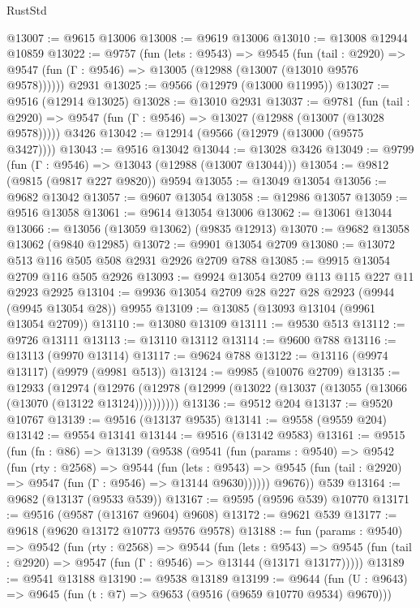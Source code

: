 \begin{lexlean}{RustStd}
\begin{coremodule}
@13007 := @9615 @13006
@13008 := @9619 @13006
@13010 := @13008 @12944 @10859
@13022 := @9757
    (fun (lets : @9543) =>
    @9545
      (fun (tail : @2920) =>
      @9547 (fun (Γ : @9546) => @13005 (@12988 (@13007 (@13010 @9576 @9578))))))
    @2931
@13025 := @9566 (@12979 (@13000 @11995))
@13027 := @9516 (@12914 @13025)
@13028 := @13010 @2931
@13037 := @9781
    (fun (tail : @2920) => @9547 (fun (Γ : @9546) => @13027 (@12988 (@13007 (@13028 @9578)))))
    @3426
@13042 := @12914 (@9566 (@12979 (@13000 (@9575 @3427))))
@13043 := @9516 @13042
@13044 := @13028 @3426
@13049 := @9799 (fun (Γ : @9546) => @13043 (@12988 (@13007 @13044)))
@13054 := @9812 (@9815 (@9817 @227 @9820)) @9594
@13055 := @13049 @13054
@13056 := @9682 @13042
@13057 := @9607 @13054
@13058 := @12986 @13057
@13059 := @9516 @13058
@13061 := @9614 @13054 @13006
@13062 := @13061 @13044
@13066 := @13056 (@13059 @13062) (@9835 @12913)
@13070 := @9682 @13058 @13062 (@9840 @12985)
@13072 := @9901 @13054 @2709
@13080 := @13072 @513 @116 @505 @508 @2931 @2926 @2709 @788
@13085 := @9915 @13054 @2709 @116 @505 @2926
@13093 := @9924 @13054 @2709 @113 @115 @227 @11 @2923 @2925
@13104 := @9936 @13054 @2709 @28 @227 @28 @2923 (@9944 (@9945 @13054 @28)) @9955
@13109 := @13085 (@13093 @13104 (@9961 @13054 @2709))
@13110 := @13080 @13109
@13111 := @9530 @513
@13112 := @9726 @13111
@13113 := @13110 @13112
@13114 := @9600 @788
@13116 := @13113 (@9970 @13114)
@13117 := @9624 @788
@13122 := @13116 (@9974 @13117) (@9979 (@9981 @513))
@13124 := @9985 (@10076 @2709)
@13135 := @12933
    (@12974 (@12976 (@12978 (@12999 (@13022 (@13037 (@13055 (@13066 (@13070 (@13122 @13124))))))))))
@13136 := @9512 @204
@13137 := @9520 @10767
@13139 := @9516 (@13137 @9535)
@13141 := @9558 (@9559 @204)
@13142 := @9554 @13141
@13144 := @9516 (@13142 @9583)
@13161 := @9515
    (fun (fn : @86) =>
    @13139
      (@9538
        (@9541
          (fun (params : @9540) =>
          @9542
            (fun (rty : @2568) =>
            @9544
              (fun (lets : @9543) =>
              @9545 (fun (tail : @2920) => @9547 (fun (Γ : @9546) => @13144 @9630))))))
        @9676))
    @539
@13164 := @9682 (@13137 (@9533 @539))
@13167 := @9595 (@9596 @539) @10770
@13171 := @9516 (@9587 (@13167 @9604) @9608)
@13172 := @9621 @539
@13177 := @9618 (@9620 @13172 @10773 @9576 @9578)
@13188 := fun (params : @9540) =>
  @9542
    (fun (rty : @2568) =>
    @9544
      (fun (lets : @9543) =>
      @9545 (fun (tail : @2920) => @9547 (fun (Γ : @9546) => @13144 (@13171 @13177)))))
@13189 := @9541 @13188
@13190 := @9538 @13189
@13199 := @9644
    (fun (U : @9643) => @9645 (fun (t : @7) => @9653 (@9516 (@9659 @10770 @9534) @9670)))

\end{coremodule}
\end{lexlean}
